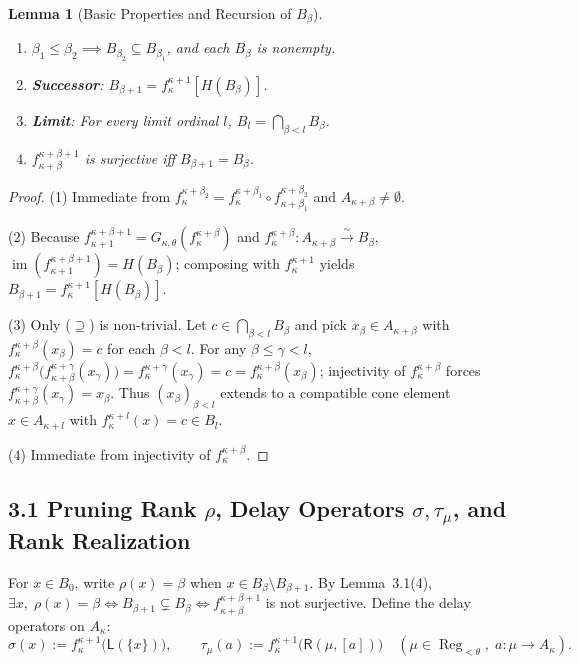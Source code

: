 \documentclass[11pt,a4paper]{article}
\theoremstyle{definition}
\theoremstyle{plain}
\newtheorem{lemma}[definition]{Lemma}
\newcommand{\im}{\operatorname{im}}
\newcommand{\Reg}{\operatorname{Reg}}
\begin{document}
\begin{lemma}[Basic Properties and Recursion of $B_\beta$]
\begin{enumerate}[label=(\arabic*)]
  \item $\beta_1 \le \beta_2 \implies B_{\beta_2} \subseteq B_{\beta_1}$, and each $B_\beta$ is nonempty.
  \item \textbf{Successor}: $B_{\beta+1} = f_\kappa^{\kappa+1}[H(B_\beta)]$.
  \item \textbf{Limit}: For every limit ordinal $l$, $B_l = \bigcap_{\beta < l} B_\beta$.
  \item $f_{\kappa+\beta}^{\kappa+\beta+1}$ is surjective iff $B_{\beta+1} = B_\beta$.
\end{enumerate}
\end{lemma}

\begin{proof}
(1) Immediate from $f_\kappa^{\kappa+\beta_2} = f_\kappa^{\kappa+\beta_1} \circ f_{\kappa+\beta_1}^{\kappa+\beta_2}$ and $A_{\kappa+\beta} \neq \emptyset$.

(2) Because $f_{\kappa+1}^{\kappa+\beta+1} = G_{\kappa,\theta}(f_\kappa^{\kappa+\beta})$ and $f_\kappa^{\kappa+\beta} : A_{\kappa+\beta} \xrightarrow{\sim} B_\beta$, $\im(f_{\kappa+1}^{\kappa+\beta+1}) = H(B_\beta)$; composing with $f_\kappa^{\kappa+1}$ yields $B_{\beta+1} = f_\kappa^{\kappa+1}[H(B_\beta)]$.

(3) Only ($\supseteq$) is non-trivial. Let $c \in \bigcap_{\beta < l} B_\beta$ and pick $x_\beta \in A_{\kappa+\beta}$ with $f_\kappa^{\kappa+\beta}(x_\beta) = c$ for each $\beta < l$. For any $\beta \le \gamma < l$, $f_\kappa^{\kappa+\beta}\bigl(f_{\kappa+\beta}^{\kappa+\gamma}(x_\gamma)\bigr) = f_\kappa^{\kappa+\gamma}(x_\gamma) = c = f_\kappa^{\kappa+\beta}(x_\beta)$; injectivity of $f_\kappa^{\kappa+\beta}$ forces $f_{\kappa+\beta}^{\kappa+\gamma}(x_\gamma) = x_\beta$. Thus $(x_\beta)_{\beta < l}$ extends to a compatible cone element $x \in A_{\kappa+l}$ with $f_\kappa^{\kappa+l}(x) = c \in B_l$.

(4) Immediate from injectivity of $f_\kappa^{\kappa+\beta}$.
\end{proof}

\subsection*{3.1 Pruning Rank $\rho$, Delay Operators $\sigma, \tau_\mu$, and Rank Realization}

For $x \in B_0$, write $\rho(x) = \beta$ when $x \in B_\beta \setminus B_{\beta+1}$. By Lemma~3.1(4), $\exists x,\; \rho(x) = \beta \iff B_{\beta+1} \subsetneq B_\beta \iff f_{\kappa+\beta}^{\kappa+\beta+1}$ is not surjective. Define the delay operators on $A_\kappa$:
\[
  \sigma(x) := f_\kappa^{\kappa+1}\bigl(\mathsf{L}(\{x\})\bigr), \qquad \tau_\mu(a) := f_\kappa^{\kappa+1}\bigl(\mathsf{R}(\mu, [a])\bigr) \quad (\mu \in \Reg_{<\theta},\; a : \mu \to A_\kappa).
\]
\end{document}
